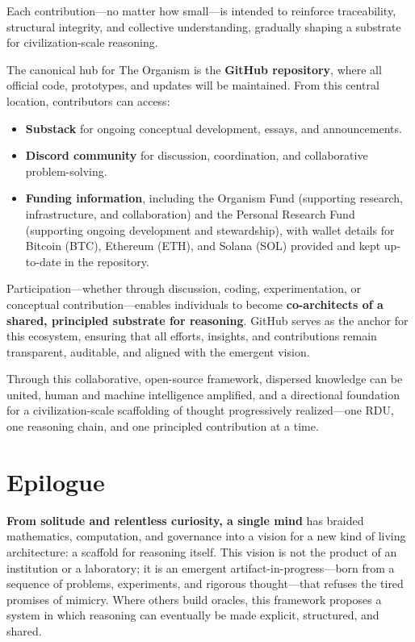 \documentclass[12pt]{article}
\begin{document}
Each contribution—no matter how small—is intended to reinforce traceability, structural integrity, and collective understanding, gradually shaping a substrate for civilization-scale reasoning.

The canonical hub for The Organism is the \textbf{GitHub repository}, where all official code, prototypes, and updates will be maintained. From this central location, contributors can access:
\begin{itemize}
\item \textbf{Substack} for ongoing conceptual development, essays, and announcements.
\item \textbf{Discord community} for discussion, coordination, and collaborative problem-solving.
\item \textbf{Funding information}, including the Organism Fund (supporting research, infrastructure, and collaboration) and the Personal Research Fund (supporting ongoing development and stewardship), with wallet details for Bitcoin (BTC), Ethereum (ETH), and Solana (SOL) provided and kept up-to-date in the repository.
\end{itemize}

Participation—whether through discussion, coding, experimentation, or conceptual contribution—enables individuals to become \textbf{co-architects of a shared, principled substrate for reasoning}. GitHub serves as the anchor for this ecosystem, ensuring that all efforts, insights, and contributions remain transparent, auditable, and aligned with the emergent vision.

Through this collaborative, open-source framework, dispersed knowledge can be united, human and machine intelligence amplified, and a directional foundation for a civilization-scale scaffolding of thought progressively realized—one RDU, one reasoning chain, and one principled contribution at a time.

\section*{Epilogue}

\noindent \textbf{From solitude and relentless curiosity, a single mind} has braided mathematics, computation, and governance into a vision for a new kind of living architecture: a scaffold for reasoning itself. This vision is not the product of an institution or a laboratory; it is an emergent artifact-in-progress—born from a sequence of problems, experiments, and rigorous thought—that refuses the tired promises of mimicry. Where others build oracles, this framework proposes a system in which reasoning can eventually be made explicit, structured, and shared.  
\end{document}
